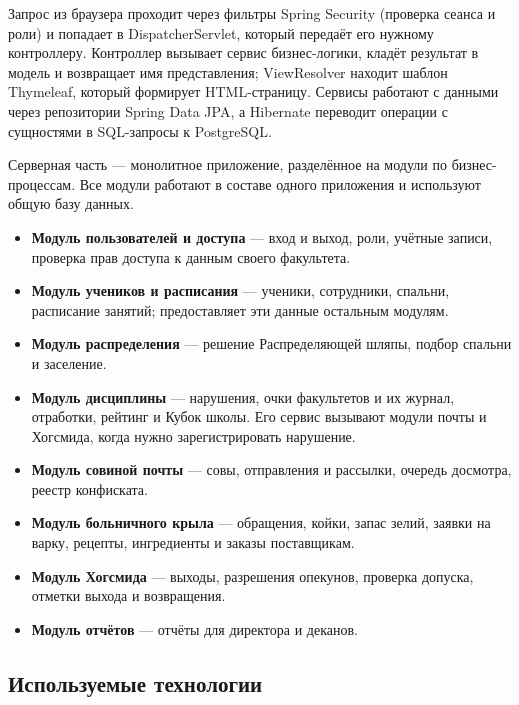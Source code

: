 \documentclass[a4paper,12pt]{article}
\begin{document}
Запрос из браузера проходит через фильтры Spring Security (проверка сеанса и роли)
и попадает в DispatcherServlet, который передаёт его нужному контроллеру. Контроллер
вызывает сервис бизнес-логики, кладёт результат в модель и возвращает имя
представления; ViewResolver находит шаблон Thymeleaf, который формирует HTML-страницу.
Сервисы работают с данными через репозитории Spring Data JPA, а Hibernate переводит
операции с сущностями в SQL-запросы к PostgreSQL.
 
Серверная часть — монолитное приложение, разделённое на модули по бизнес-процессам.
Все модули работают в составе одного приложения и используют общую базу данных.
\begin{itemize}
  \item \textbf{Модуль пользователей и доступа} — вход и выход, роли, учётные записи,
        проверка прав доступа к данным своего факультета.
  \item \textbf{Модуль учеников и расписания} — ученики, сотрудники, спальни,
        расписание занятий; предоставляет эти данные остальным модулям.
  \item \textbf{Модуль распределения} — решение Распределяющей шляпы,
        подбор спальни и заселение.
  \item \textbf{Модуль дисциплины} — нарушения, очки факультетов и их журнал,
        отработки, рейтинг и Кубок школы. Его сервис вызывают модули почты и Хогсмида,
        когда нужно зарегистрировать нарушение.
  \item \textbf{Модуль совиной почты} — совы, отправления и рассылки, очередь досмотра,
        реестр конфиската.
  \item \textbf{Модуль больничного крыла} — обращения, койки, запас зелий,
        заявки на варку, рецепты, ингредиенты и заказы поставщикам.
  \item \textbf{Модуль Хогсмида} — выходы, разрешения опекунов, проверка допуска,
        отметки выхода и возвращения.
  \item \textbf{Модуль отчётов} — отчёты для директора и деканов.
\end{itemize}
 
\subsection{Используемые технологии}
 
\end{document}
